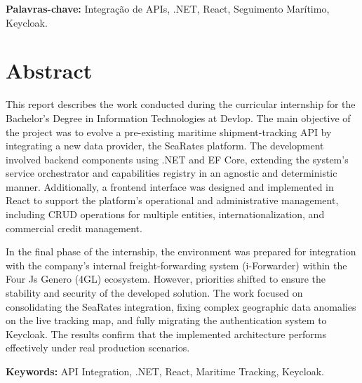 \documentclass[a4paper,12pt]{report}
\begin{document}
\vspace{1cm}
\noindent\textbf{Palavras-chave:} Integração de APIs, .NET, React, Seguimento Marítimo, Keycloak.

\newpage

\chapter*{Abstract}

This report describes the work conducted during the curricular internship for the Bachelor's Degree in Information Technologies at Devlop. The main objective of the project was to evolve a pre-existing maritime shipment-tracking API by integrating a new data provider, the SeaRates platform. The development involved backend components using .NET and EF Core, extending the system's service orchestrator and capabilities registry in an agnostic and deterministic manner. Additionally, a frontend interface was designed and implemented in React to support the platform's operational and administrative management, including CRUD operations for multiple entities, internationalization, and commercial credit management.

In the final phase of the internship, the environment was prepared for integration with the company's internal freight-forwarding system (i-Forwarder) within the Four Js Genero (4GL) ecosystem. However, priorities shifted to ensure the stability and security of the developed solution. The work focused on consolidating the SeaRates integration, fixing complex geographic data anomalies on the live tracking map, and fully migrating the authentication system to Keycloak. The results confirm that the implemented architecture performs effectively under real production scenarios.

\vspace{1cm}
\noindent\textbf{Keywords:} API Integration, .NET, React, Maritime Tracking, Keycloak.

\newpage

\tableofcontents
\newpage

\listoffigures
{}
\newpage

\listoftables
{}

\newpage
\printnoidxglossary[title=Lista de Siglas e Abreviaturas, style=altlist]
\end{document}
